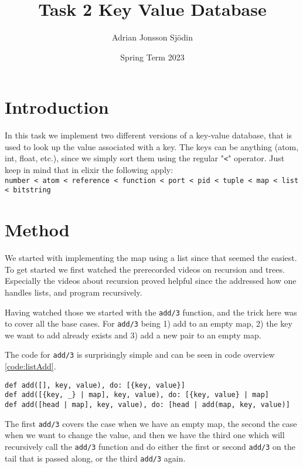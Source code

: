 \documentclass[a4paper,11pt]{article}
\newenvironment{code}{\captionsetup{type=listing}}{}
\begin{document}
\title{
    \textbf{Task 2 Key Value Database}
}
\author{Adrian Jonsson Sjödin}
\date{Spring Term 2023}

\maketitle

\section*{Introduction}
In this task we implement two different versions of a key-value database, that is used to look up the value associated with a key. The keys can be
anything (atom, int, float, etc.), since we simply sort them using the regular "{\tt <}" operator. Just keep in mind that in elixir the following apply:\\
{\tt number < atom < reference < function < port < pid < tuple < map < list < bitstring}


\section*{Method}
We started with implementing the map using a list since that seemed the easiest. To get started we first watched the prerecorded videos on recursion
and trees. Especially the videos about recursion proved helpful since the addressed how one handles lists, and program recursively.

Having watched those we started with the {\tt add/3} function, and the trick here was to cover all the base cases. For {\tt add/3} being
1) add to an empty map, 2) the key we want to add already exists and 3) add a new pair to an empty map.

The code for {\tt add/3} is surprisingly simple and can be seen in code overview \ref{code:listAdd}.

\begin{code}
    \label{code:listAdd}
    \begin{verbatim}
def add([], key, value), do: [{key, value}]
def add([{key, _} | map], key, value), do: [{key, value} | map]
def add([head | map], key, value), do: [head | add(map, key, value)]
\end{verbatim}
\end{code}
The first {\tt add/3} covers the case when we have an empty map, the second the case when we want to change the value, and then we have the third
one which will recursively call the {\tt add/3} function and do either the first or second {\tt add/3} on the tail that is passed along, or the third
    {\tt add/3} again.
\end{document}
